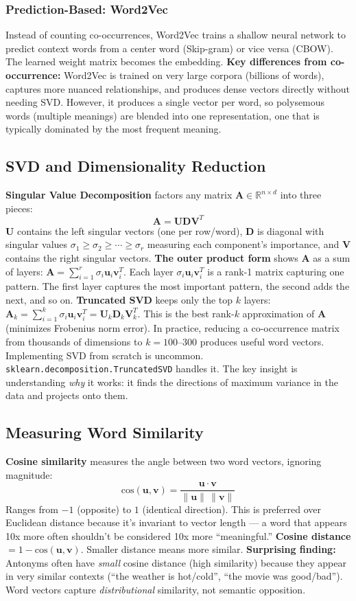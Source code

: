 \documentclass[11pt]{article}
\begin{document}
\subsubsection{Prediction-Based: Word2Vec}
Instead of counting co-occurrences, Word2Vec trains a shallow neural network to predict context words from a center word (Skip-gram) or vice versa (CBOW). The learned weight matrix becomes the embedding.
\textbf{Key differences from co-occurrence:}
Word2Vec is trained on very large corpora (billions of words), captures more nuanced relationships, and produces dense vectors directly without needing SVD. However, it produces a single vector per word, so polysemous words (multiple meanings) are blended into one representation, one that is typically dominated by the most frequent meaning.
\subsection{SVD and Dimensionality Reduction}
\textbf{Singular Value Decomposition} factors any matrix $\mathbf{A} \in \mathbb{R}^{n \times d}$ into three pieces:
\[
\mathbf{A} = \mathbf{U}\mathbf{D}\mathbf{V}^T
\]
$\mathbf{U}$ contains the left singular vectors (one per row/word), $\mathbf{D}$ is diagonal with singular values $\sigma_1 \geq \sigma_2 \geq \cdots \geq \sigma_r$ measuring each component's importance, and $\mathbf{V}$ contains the right singular vectors.
\newpage
\textbf{The outer product form} shows $\mathbf{A}$ as a sum of layers:
$\mathbf{A} = \sum_{i=1}^{r} \sigma_i \mathbf{u}_i \mathbf{v}_i^T$.
Each layer $\sigma_i \mathbf{u}_i \mathbf{v}_i^T$ is a rank-1 matrix capturing one pattern. The first layer captures the most important pattern, the second adds the next, and so on.
\textbf{Truncated SVD} keeps only the top $k$ layers: $\mathbf{A}_k = \sum_{i=1}^{k} \sigma_i \mathbf{u}_i \mathbf{v}_i^T = \mathbf{U}_k \mathbf{D}_k \mathbf{V}_k^T$. This is the best rank-$k$ approximation of $\mathbf{A}$ (minimizes Frobenius norm error). In practice, reducing a co-occurrence matrix from thousands of dimensions to $k = 100$--$300$ produces useful word vectors.
Implementing SVD from scratch is uncommon. \texttt{sklearn.decomposition.TruncatedSVD} handles it. The key insight is understanding \textit{why} it works: it finds the directions of maximum variance in the data and projects onto them.
\subsection{Measuring Word Similarity}
\textbf{Cosine similarity} measures the angle between two word vectors, ignoring magnitude:
\[
\text{cos}(\mathbf{u}, \mathbf{v}) = \frac{\mathbf{u} \cdot \mathbf{v}}{\|\mathbf{u}\| \, \|\mathbf{v}\|}
\]
Ranges from $-1$ (opposite) to $1$ (identical direction). This is preferred over Euclidean distance because it's invariant to vector length --- a word that appears 10x more often shouldn't be considered 10x more ``meaningful.''
\textbf{Cosine distance} $= 1 - \text{cos}(\mathbf{u}, \mathbf{v})$. Smaller distance means more similar.
\textbf{Surprising finding:} Antonyms often have \textit{small} cosine distance (high similarity) because they appear in very similar contexts (``the weather is hot/cold'', ``the movie was good/bad''). Word vectors capture \textit{distributional} similarity, not semantic opposition.
\end{document}
